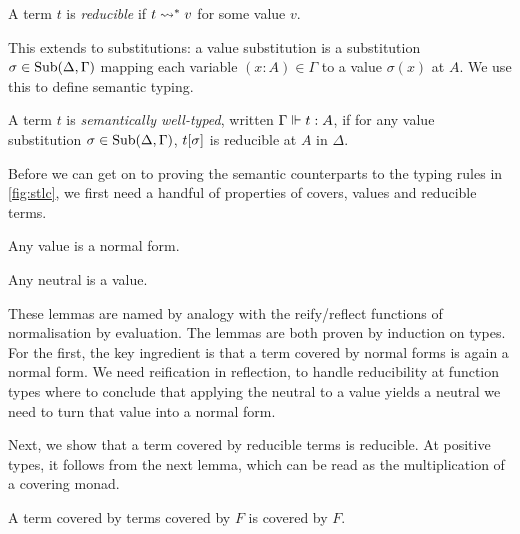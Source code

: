 \documentclass[a4paper,UKenglish,cleveref, autoref, thm-restate]{lipics-v2021}
\begin{document}
\begin{definition}
  A term \(t\) is \emph{reducible} if \(t \rightsquigarrow^* v\) for some value \(v\).
\end{definition}

This extends to substitutions: a value substitution
is a substitution \(\sigma \in \Sub(\Delta,\Gamma)\) mapping each variable
\((x : A) \in \Gamma\) to a value \(\sigma(x)\) at \(A\).
We use this to define semantic typing.

\begin{definition}
  A term \(t\) is \emph{semantically well-typed}, written \(\semty{\Gamma}{t}[A]\),
  if for any value substitution \(\sigma \in \Sub(\Delta,\Gamma)\), \(\subs{t}{\sigma}\)
  is reducible at \(A\) in \(\Delta\).
\end{definition}


Before we can get on to proving the semantic counterparts to the typing rules in
\cref{fig:stlc}, we first need a handful of properties of covers, values and
reducible terms.

\begin{lemma}
  Any value is a normal form.
\end{lemma}

\begin{lemma}
  \label{lem:reflect}
  Any neutral is a value. 
\end{lemma}
These lemmas are named by analogy with the reify/reflect functions of normalisation by
evaluation. The lemmas are both proven by induction on
types. For the first, the key ingredient is that a term covered by normal
forms is again a normal form. We need reification in reflection, to handle
reducibility at function types where to conclude that applying the neutral
to a value yields a neutral we need to turn that value into a normal form.

Next, we show that a term covered by reducible terms is reducible.
At positive types, it follows from the next lemma, which can be read as
the multiplication of a covering monad.
\begin{lemma}
  A term covered by terms covered by \(F\) is covered by \(F\).
\end{lemma}
\end{document}
